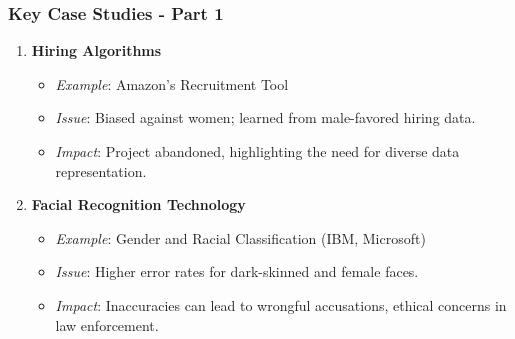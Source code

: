 \documentclass[aspectratio=169]{beamer}
\begin{document}
\begin{frame}[fragile]
    \frametitle{Key Case Studies - Part 1}
    \begin{enumerate}
        \item \textbf{Hiring Algorithms}
            \begin{itemize}
                \item \textit{Example}: Amazon's Recruitment Tool
                \item \textit{Issue}: Biased against women; learned from male-favored hiring data.
                \item \textit{Impact}: Project abandoned, highlighting the need for diverse data representation.
            \end{itemize}
        
        \item \textbf{Facial Recognition Technology}
            \begin{itemize}
                \item \textit{Example}: Gender and Racial Classification (IBM, Microsoft)
                \item \textit{Issue}: Higher error rates for dark-skinned and female faces.
                \item \textit{Impact}: Inaccuracies can lead to wrongful accusations, ethical concerns in law enforcement.
            \end{itemize}
    \end{enumerate}
\end{frame}
\end{document}
